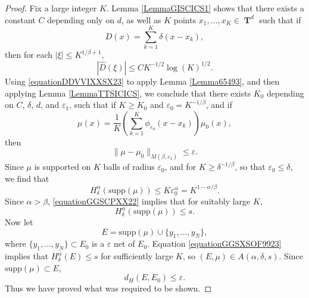 \documentclass[12pt,reqno]{article}
\numberwithin{equation}{section}
\DeclareMathOperator{\TT}{\mathbf{T}}
\begin{document}
\begin{proof}
    Fix a large integer $K$. Lemma \ref{LemmaGISCICS1} shows that there exists a constant $C$ depending only on $d$, as well as $K$ points $x_1, \dots, x_K \in \TT^d$ such that if
    \[ D(x) = \sum_{k = 1}^K \delta(x - x_k), \]
    then for each $|\xi| \leq K^{1/\beta + 1}$,
    \begin{equation} \label{equationDDVVIXXSX23}
        |\widehat{D}(\xi)| \leq C K^{-1/2} \log(K)^{1/2}.
    \end{equation}
    Using \eqref{equationDDVVIXXSX23} to apply Lemma \ref{Lemma65493}, and then applying Lemma \ref{LemmaTTSICICS}, we conclude that there exists $K_0$ depending on $C$, $\delta$, $d$, and $\varepsilon_1$, such that if $K \geq K_0$ and $\varepsilon_0 = K^{-1/\beta}$, and if
    \[ \mu(x) = \frac{1}{K} \left( \sum_{k = 1}^K \phi_{\varepsilon_0}(x - x_k) \right) \mu_0(x), \]
    then
    \begin{equation} \label{equationYYUDUSC4434}
        \| \mu - \mu_0 \|_{M(\beta,\varepsilon_1)} \leq \varepsilon.
    \end{equation}
    Since $\mu$ is supported on $K$ balls of radius $\varepsilon_0$, and for $K \geq \delta^{-1/\beta}$, so that $\varepsilon_0 \leq \delta$, we find that
    \begin{equation} \label{equationGGSCPXX22}
        H^\alpha_\delta(\text{supp}(\mu)) \leq K \varepsilon_0^\alpha = K^{1 - \alpha/\beta}.
    \end{equation}
    Since $\alpha > \beta$, \eqref{equationGGSCPXX22} implies that for suitably large $K$,
    \begin{equation} \label{equationGGSXSOF9923}
        H^\alpha_\delta(\text{supp}(\mu)) \leq s.
    \end{equation}
    Now let
    \[ E = \text{supp}(\mu) \cup \{ y_1, \dots, y_N \}, \]
    where $\{ y_1, \dots, y_N \} \subset E_0$ is a $\varepsilon$ net of $E_0$. Equation \eqref{equationGGSXSOF9923} implies that $H^\alpha_\delta(E) \leq s$ for sufficiently large $K$, so $(E,\mu) \in A(\alpha,\delta,s)$. Since $\text{supp}(\mu) \subset E$,
    \begin{equation} \label{equationGGISIICV222}
        d_H(E,E_0) \leq \varepsilon.
    \end{equation}
    Thus we have proved what was required to be shown.
\end{proof}
\end{document}
